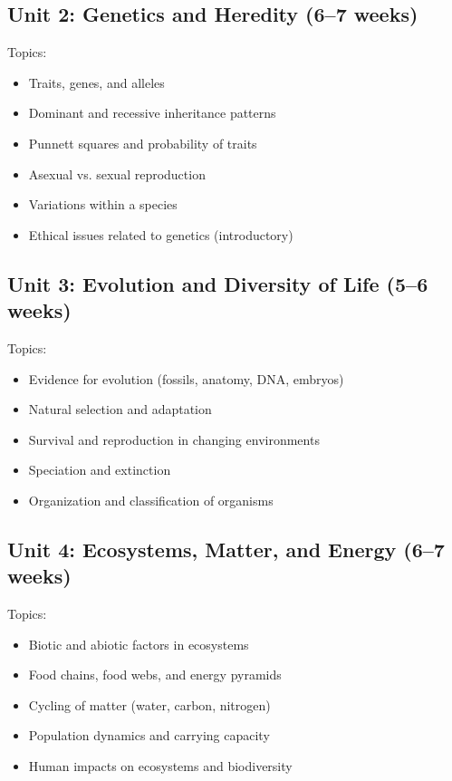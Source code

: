 \documentclass[11pt,letterpaper]{report}
\begin{document}
\subsection{Unit 2: Genetics and Heredity (6–7 weeks)}

Topics:
\begin{itemize}
\item Traits, genes, and alleles
\item Dominant and recessive inheritance patterns
\item Punnett squares and probability of traits
\item Asexual vs. sexual reproduction
\item Variations within a species
\item Ethical issues related to genetics (introductory)
\end{itemize}

\subsection{Unit 3: Evolution and Diversity of Life (5–6 weeks)}

Topics:
\begin{itemize}
\item Evidence for evolution (fossils, anatomy, DNA, embryos)
\item Natural selection and adaptation
\item Survival and reproduction in changing environments
\item Speciation and extinction
\item Organization and classification of organisms
\end{itemize}

\subsection{Unit 4: Ecosystems, Matter, and Energy (6–7 weeks)}

Topics:
\begin{itemize}
\item Biotic and abiotic factors in ecosystems
\item Food chains, food webs, and energy pyramids
\item Cycling of matter (water, carbon, nitrogen)
\item Population dynamics and carrying capacity
\item Human impacts on ecosystems and biodiversity
\end{itemize}
\end{document}
